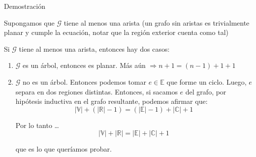 \documentclass[8pt]{beamer}
\newcommand \anchoPagina{1.0} %
\begin{document}
\begin{frame}{Demostraci\'on}
	\begin{minipage}{\anchoPagina \textwidth}
		Supongamos que $\mathcal{G}$ tiene al menos una arista (un grafo sin aristas es trivialmente planar y cumple la ecuaci\'on, notar que la regi\'on exterior cuenta como tal)
		\pause
		
		Si $\mathcal{G}$ tiene al menos una arista, entonces hay dos casos:
		\pause
		\begin{enumerate}
			\item $\mathcal{G}$ es un \'arbol, entonces es planar. M\'as a\'un \pause $\Rightarrow n+1 = (n-1)+1+1$
			\pause
			\item $\mathcal{G}$ no es un \'arbol. Entonces podemos tomar $e \in \mathbb{E}$ que forme un ciclo. Luego, $e$ separa en dos regiones distintas. Entonces, si sacamos $e$ del grafo, por hip\'otesis inductiva en el grafo resultante, podemos afirmar que:
			$$ |\mathbb{V}| + (|\mathbb{R}| - 1) = (|\mathbb{E}|-1) + |\mathbb{C}| + 1  $$
			
			Por lo tanto \dots
			\pause
			$$ |\mathbb{V}| + |\mathbb{R}| = |\mathbb{E}| + |\mathbb{C}| + 1 $$
			
			que es lo que quer\'iamos probar.
				
		\end{enumerate}
	\end{minipage}
\end{frame}
\end{document}
